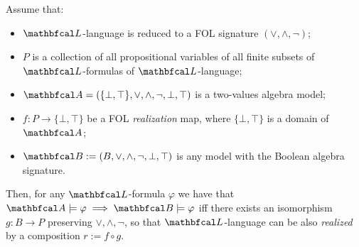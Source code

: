 \begin{lemma}\label{lemma_gen_fol_rel}
  Assume that:
  \begin{itemize}
    \item $\lsign$-language is reduced to a FOL signature $(\lor, \land, \neg)$;
    \item $P$ is a collection of all propositional variables of all finite subsets of $\lsign$-formulas of $\lsign$-language;
    \item $\LsA = (\{\bot,\top\}, \lor, \land, \neg, \bot, \top)$ is a two-values algebra model;
    \item $f: P \to \{\bot,\top\}$ be a FOL \textit{realization} map, where $\{\bot,\top\}$ is a domain of $\LsA$;
    \item $\LsB := (B, \lor, \land, \neg, \bot, \top)$ is any model with the Boolean algebra signature.
  \end{itemize}
  
  Then, for any $\lsign$-formula $\varphi$ we have that $\LsA \models \varphi \implies \LsB \models \varphi$ iff there exists an isomorphism $g: B \to P$ preserving $\lor, \land, \neg$, so that $\lsign$-language can be also \textit{realized} by a composition $r := f \circ g$.
\end{lemma}
